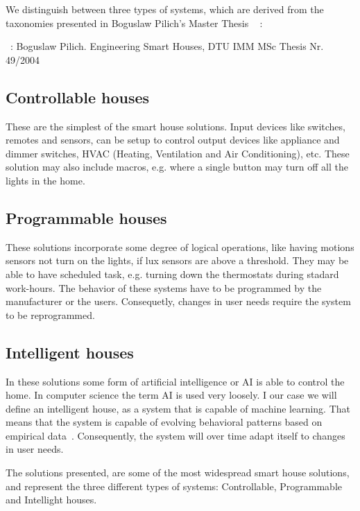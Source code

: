 We distinguish between three types of systems, which are derived from the taxonomies presented in Boguslaw Pilich's Master Thesis ~\citep{Boguslaw} :

~\citep{Boguslaw}: Boguslaw Pilich. Engineering Smart Houses, DTU IMM MSc Thesis Nr. 49\slash 2004

\subsection{Controllable houses}
\label{controllablehouses}

These are the simplest of the smart house solutions. Input devices like switches, remotes and sensors, can be setup to control output devices like appliance and dimmer switches, HVAC (Heating, Ventilation and Air Conditioning), etc. These solution may also include macros, e.g. where a single button may turn off all the lights in the home. 

\subsection{Programmable houses}
\label{programmablehouses}

These solutions incorporate some degree of logical operations, like having motions sensors not turn on the lights, if lux sensors are above a threshold. They may be able to have scheduled task, e.g. turning down the thermostats during stadard work-hours. The behavior of these systems have to be programmed by the manufacturer or the users. Consequetly, changes in user needs require the system to be reprogrammed.

\subsection{Intelligent houses}
\label{intelligenthouses}

In these solutions some form of artificial intelligence or AI is able to control the home. In computer science the term AI is used very loosely. I our case we will define an intelligent house, as a system that is capable of machine learning. That means that the system is capable of evolving behavioral patterns based on empirical data~\citep{wikipedia-machine-learning}. Consequently, the system will over time adapt itself to changes in user needs.

The solutions presented, are some of the most widespread smart house solutions, and represent the three different types of systems: Controllable, Programmable and Intellight houses.

